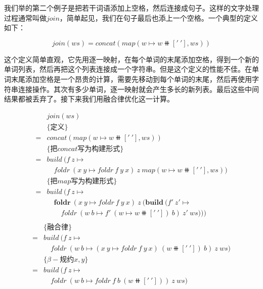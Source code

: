 \documentclass[b5paper]{ctexart}
\begin{document}
\begin{example}
我们举的第二个例子是把若干词语添加上空格，然后连接成句子。这样的文字处理过程通常叫做$join$，简单起见，我们在句子最后也添上一个空格。一个典型的定义如下：

\[
join(ws) = concat(map(w \mapsto w \doubleplus ['\ '], ws))
\]

这个定义简单直观，它先用逐一映射，在每个单词的末尾添加空格，得到一个新的单词列表，然后再把这个列表连接成一个字符串。但是这个定义的性能不佳。在单词末尾添加空格是一个昂贵的计算，需要先移动到每个单词的末尾，然后再使用字符串连接操作。其次有多少单词，逐一映射就会产生多长的新列表。最后这些中间结果都被丢弃了。接下来我们用融合律优化这一计算。

\[ \begin{array}{rl}
  & join(ws) \\
  & \{\text{定义} \} \\
= & concat(map(w \mapsto w \doubleplus ['\ '], ws)) \\

  & \{\text{把$concat$写为构建形式}\} \\
= & build\ (f\ z \mapsto \\
  & \quad foldr\ (x\ y \mapsto foldr\ f\ y\ x)\ z\ map(w \mapsto w \doubleplus ['\ '], ws)) \\

  & \{\text{把$map$写为构建形式}\} \\
= & build\ (f\ z \mapsto \\
  & \quad \pmb{foldr}\ (x\ y \mapsto foldr\ f\ y\ x)\ z\ (\pmb{build}\ (f'\ z' \mapsto \\
  & \quad \quad foldr\ (w\ b \mapsto f'\ (w \mapsto w \doubleplus ['\ '])\ b)\ z'\ ws))) \\
\end{array}
\]
\[ \begin{array}{rl}
  & \{\text{融合律}\} \\
= & build\ (f\ z \mapsto \\
  & \quad foldr\ (w\ b \mapsto (x\ y \mapsto foldr\ f\ y\ x)\ (w \doubleplus ['\ '])\ b)\ z\ ws) \\

  & \{\beta-\text{规约}x, y\} \\
= & build\ (f\ z \mapsto \\
  & \quad foldr\ (w\ b \mapsto foldr\ f\ b\ (w \doubleplus ['\ ']))\ z\ ws) \\


\end{array}\]
\end{example}
\end{document}
